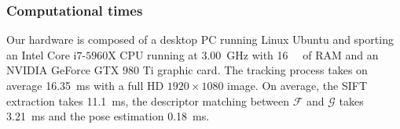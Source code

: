 \subsubsection{Computational times}
Our hardware is composed of a desktop PC running Linux Ubuntu and sporting an Intel Core i$7$-$5960$X CPU running at \SI{3.00}{\giga\hertz} with \SI{16}{\giga\byte} of RAM and an NVIDIA GeForce GTX $980$ Ti graphic card.
The tracking process takes on average \SI{16.35}{\milli\second} with a full HD $1920\times1080$ image.
On average, the SIFT extraction takes \SI{11.1}{\milli\second}, the descriptor matching between $\mathcal{F}$ and $\mathcal{G}$ takes \SI{3.21}{\milli\second}  and the pose estimation \SI{0.18}{\milli\second}.





